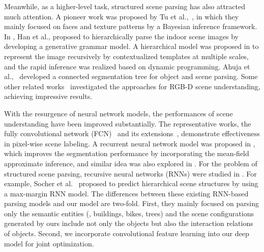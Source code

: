 \documentclass[10pt,twocolumn,letterpaper]{article}
\begin{document}
Meanwhile, as a higher-level task, structured scene parsing has also attracted much attention. A pioneer work was proposed by Tu et al.,~\cite{tu2005image}, in which they mainly focused on faces and texture patterns by a Bayesian inference framework. In \cite{DBLP:ImageParsing-Attribute}, Han et al., proposed to hierarchically parse the indoor scene images by developing a generative grammar model. A hierarchical model was proposed in \cite{zhu2012recursive} to represent the image recursively by contextualized templates at multiple scales, and the rapid inference was realized based on dynamic programming. Ahuja et al.,~\cite{ahuja2008connected} developed a connected segmentation tree for object and scene parsing. Some other related works~\cite{silberman2012indoor}\cite{gupta2013perceptual} investigated the approaches for RGB-D scene understanding, achieving impressive results.



With the resurgence of neural network models, the performances of scene understanding have been improved substantially. The representative works, the fully convolutional network (FCN)~\cite{DBLP:FCnetwork} and its extensions~\cite{DBLP:CNN-CRF}, demonstrate effectiveness in pixel-wise scene labeling. A recurrent neural network model was proposed in \cite{DBLP:CRF-RNN}, which improves the segmentation performance by incorporating the mean-field approximate inference, and similar idea was also explored in \cite{DBLP:CNN-MRF}. For the problem of structured scene parsing, recursive neural networks (RNNs) were studied in \cite{DBLP:Recursive_Socher}\cite{DBLP:RecursiveContext2}. For example, Socher et al.~\cite{DBLP:Recursive_Socher} proposed to predict hierarchical scene structures by using a max-margin RNN model. The differences between these existing RNN-based parsing models and our model are two-fold. First, they mainly focused on parsing only the semantic entities (\eg, buildings, bikes, trees) and the scene configurations generated by ours include not only the objects but also the interaction relations of objects. Second, we incorporate convolutional feature learning into our deep model for joint optimization.
\end{document}
